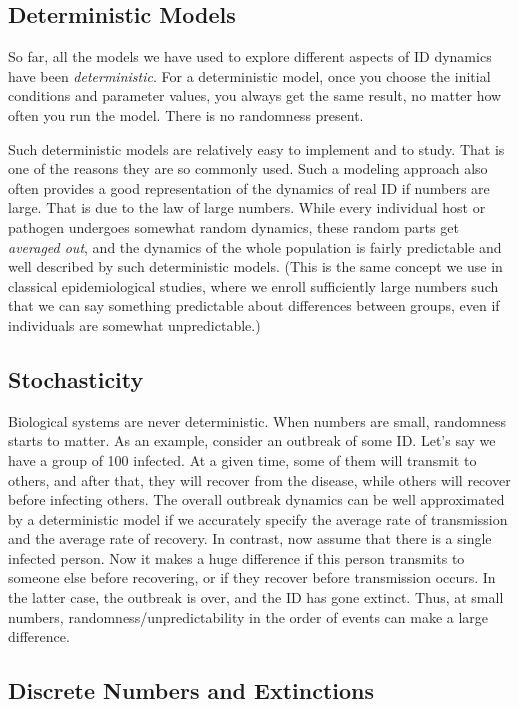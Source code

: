 \documentclass[]{article}
\theoremstyle{definition}
\theoremstyle{definition}
\theoremstyle{definition}
\theoremstyle{remark}
\begin{document}
\subsection{Deterministic Models}\label{deterministic-models}

So far, all the models we have used to explore different aspects of ID
dynamics have been \emph{deterministic}. For a deterministic model, once
you choose the initial conditions and parameter values, you always get
the same result, no matter how often you run the model. There is no
randomness present.

Such deterministic models are relatively easy to implement and to study.
That is one of the reasons they are so commonly used. Such a modeling
approach also often provides a good representation of the dynamics of
real ID if numbers are large. That is due to the law of large numbers.
While every individual host or pathogen undergoes somewhat random
dynamics, these random parts get \emph{averaged out}, and the dynamics
of the whole population is fairly predictable and well described by such
deterministic models. (This is the same concept we use in classical
epidemiological studies, where we enroll sufficiently large numbers such
that we can say something predictable about differences between groups,
even if individuals are somewhat unpredictable.)

\subsection{Stochasticity}\label{stochasticity}

Biological systems are never deterministic. When numbers are small,
randomness starts to matter. As an example, consider an outbreak of some
ID. Let's say we have a group of 100 infected. At a given time, some of
them will transmit to others, and after that, they will recover from the
disease, while others will recover before infecting others. The overall
outbreak dynamics can be well approximated by a deterministic model if
we accurately specify the average rate of transmission and the average
rate of recovery. In contrast, now assume that there is a single
infected person. Now it makes a huge difference if this person transmits
to someone else before recovering, or if they recover before
transmission occurs. In the latter case, the outbreak is over, and the
ID has gone extinct. Thus, at small numbers, randomness/unpredictability
in the order of events can make a large difference.

\subsection{Discrete Numbers and
Extinctions}\label{discrete-numbers-and-extinctions}
\end{document}

